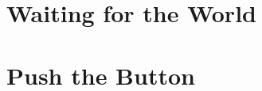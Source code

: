\documentclass[a5paper,oneside]{scrbook}
\begin{document}
	



%

%

%

%

\chapter*{Waiting for the World\label{medio1}}


\chapter{Push the Button\label{ch4}}


%

%
\end{document}
